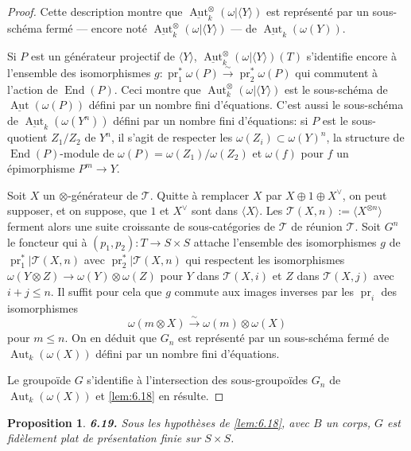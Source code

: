 \documentclass[12pt,a4paper]{article}
\theoremstyle{plain}
\newtheorem{proposition}[theorem]{Proposition}
\theoremstyle{definition}
\theoremstyle{remark}
\DeclareMathOperator{\End}{End}
\DeclareMathOperator{\Aut}{Aut}
\DeclareMathOperator{\pr}{pr}
\begin{document}
\begin{proof}
Cette description montre que $\underline{\Aut}^\otimes_k(\omega|\langle Y \rangle)$ est représenté par un sous-schéma fermé --- encore noté $\underline{\Aut}^\otimes_k(\omega|\langle Y \rangle)$ --- de $\underline{\Aut}_k(\omega(Y))$.

Si $P$ est un générateur projectif de $\langle Y \rangle$, $\underline{\Aut}^\otimes_k(\omega|\langle Y \rangle)(T)$ s'identifie encore à l'ensemble des isomorphismes $g : \pr_1^* \omega(P) \xrightarrow{\sim} \pr_2^* \omega(P)$ qui commutent à l'action de $\End(P)$. Ceci montre que $\Aut^\otimes_k(\omega|\langle Y \rangle)$ est le sous-schéma de $\underline{\Aut}(\omega(P))$ défini par un nombre fini d'équations. C'est aussi le sous-schéma de $\underline{\Aut}_k(\omega(Y^n))$ défini par un nombre fini d'équations: si $P$ est le sous-quotient $Z_1/Z_2$ de $Y^n$, il s'agit de respecter les $\omega(Z_i) \subset \omega(Y)^n$, la structure de $\End(P)$-module de $\omega(P) = \omega(Z_1)/\omega(Z_2)$ et $\omega(f)$ pour $f$ un épimorphisme $P^m \to Y$.

Soit $X$ un $\otimes$-générateur de $\mathcal{T}$. Quitte à remplacer $X$ par $X \oplus 1 \oplus X^\vee$, on peut supposer, et on suppose, que $1$ et $X^\vee$ sont dans $\langle X \rangle$. Les $\mathcal{T}(X,n) := \langle X^{\otimes n} \rangle$ ferment alors une suite croissante de sous-catégories de $\mathcal{T}$ de réunion $\mathcal{T}$. Soit $G^n$ le foncteur qui à $(p_1,p_2) : T \to S \times S$ attache l'ensemble des isomorphismes $g$ de $\pr_1^*|\mathcal{T}(X,n)$ avec $\pr_2^*|\mathcal{T}(X,n)$ qui respectent les isomorphismes $\omega(Y \otimes Z) \to \omega(Y) \otimes \omega(Z)$ pour $Y$ dans $\mathcal{T}(X,i)$ et $Z$ dans $\mathcal{T}(X,j)$ avec $i + j \leq n$. Il suffit pour cela que $g$ commute aux images inverses par les $\pr_i$ des isomorphismes
\[
\omega(m \otimes X) \xrightarrow{\sim} \omega(m) \otimes \omega(X)
\]
pour $m \leq n$. On en déduit que $G_n$ est représenté par un sous-schéma fermé de $\Aut_k(\omega(X))$ défini par un nombre fini d'équations.

Le groupoïde $G$ s'identifie à l'intersection des sous-groupoïdes $G_n$ de $\Aut_k(\omega(X))$ et \ref{lem:6.18} en résulte.
\end{proof}

\begin{proposition}\label{prop:6.19}
\textbf{6.19.} Sous les hypothèses de \ref{lem:6.18}, avec $B$ un corps, $G$ est fidèlement plat de présentation finie sur $S \times S$.
\end{proposition}
\end{document}
